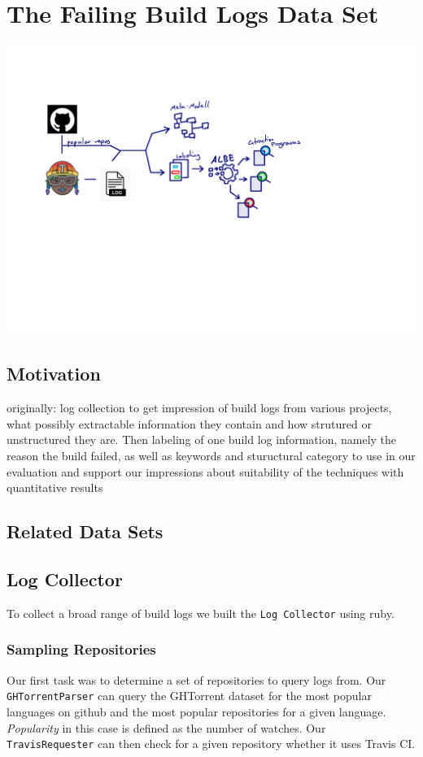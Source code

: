 \documentclass[\myrootdir/main.tex]{subfiles}
\begin{document}
\chapter{The Failing Build Logs Data Set}
\includegraphics[page=5, width=\textwidth, trim={0.5cm 0.5cm 0.5cm 0.5cm}, clip]{img/flow-of-research.pdf}

\label{sec:data-set}
\section{Motivation}
originally: log collection to get impression of build logs from various projects, what possibly extractable information they contain and how strutured or unstructured they are.
Then labeling of one build log information, namely the reason the build failed, as well as keywords and stuructural category to use in our evaluation and support our impressions about suitability of the techniques with quantitative results

\section{Related Data Sets}

\section{Log Collector}
To collect a broad range of build logs we built the \texttt{Log Collector} using ruby.

  \subsection{Sampling Repositories}
  Our first task was to determine a set of repositories to query logs from. Our \texttt{GHTorrentParser} can query the GHTorrent dataset for the most popular languages on github and the most popular repositories for a given language. \emph{Popularity} in this case is defined as the number of watches. Our \texttt{TravisRequester} can then check for a given repository whether it uses Travis CI.
\end{document}
